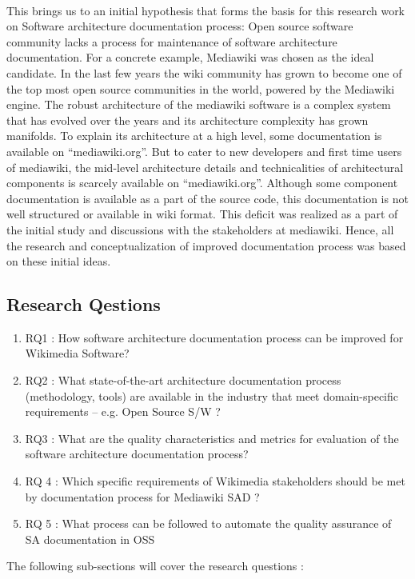 \\\indent This brings us to an initial hypothesis that forms the basis for this research work on Software architecture documentation process: Open source software community lacks a process for maintenance of software architecture documentation. 
For a concrete example, Mediawiki was chosen as the ideal candidate. In the last few years the wiki community has grown to become one of the top most open source communities in the world, powered by the Mediawiki engine. The robust architecture of the mediawiki software is a complex system that has evolved over the years and its architecture complexity has grown manifolds. To explain its architecture at a high level, some documentation is available on “mediawiki.org”. But to cater to new developers and first time users of mediawiki, the mid-level architecture details and technicalities of architectural components is scarcely available on “mediawiki.org”. Although some component documentation is available as a part of the source code, this documentation is not well structured or available in wiki format. This deficit was realized as a part of the initial study and discussions with the stakeholders at mediawiki. Hence, all the research and conceptualization of improved documentation process was based on these initial ideas. 

\subsection{Research Qestions}
\begin{enumerate}
\item RQ1 : How software architecture documentation process can be improved for Wikimedia Software?
\item RQ2 : What state-of-the-art architecture documentation process (methodology, tools) are available in the industry that meet domain-specific requirements – e.g. Open Source S/W ?
\item RQ3 : What are the quality characteristics and metrics for evaluation of the software architecture documentation process?
\item RQ 4 : Which specific requirements of Wikimedia stakeholders should be met by documentation process for Mediawiki SAD ?
\item RQ 5 : What process can be followed to automate the quality assurance of SA documentation in OSS
\end{enumerate}

The following sub-sections will cover the research questions : 
 
